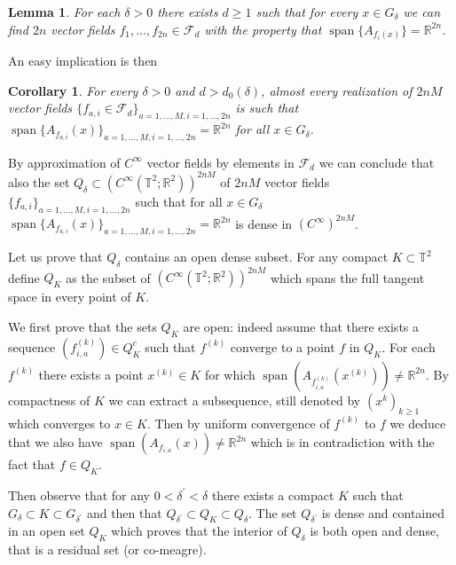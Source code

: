 \documentclass[11pt,a4paper]{article}%
\newtheorem{corollary}[theorem]{Corollary}
\newtheorem{lemma}[theorem]{Lemma}
\begin{document}
\begin{lemma}
For each $\delta> 0$ there exists $d \geqslant1$ such that for every $x \in
G_{\delta}$ we can find $2 n$ vector fields $f_{1}, \ldots, f_{2 n}
\in\mathcal{F}_{d}$ with the property that $\operatorname{span}  \{A_{f_{i}
(x)} \}=\mathbb{R}^{2 n}$.
\end{lemma}

An easy implication is then

\begin{corollary}
For every $\delta> 0$ and $d > d_{0} (\delta)$, almost every realization of $2
n  M$ vector fields $\{f_{a, i} \in\mathcal{F}_{d} \}_{a = 1, \ldots, M, i =
1, \ldots, 2 n}$ is such that $\operatorname{span}  \{A_{f_{a, i}} (x)\}_{a =
1, \ldots, M, i = 1, \ldots, 2 n} =\mathbb{R}^{2 n}$ for all $x \in G_{\delta
}$.
\end{corollary}

By approximation of $C^{\infty}$ vector fields by elements in $\mathcal{F}%
_{d}$ we can conclude that also the set $Q_{\delta} \subset(C^{\infty
}(\mathbb{T}^{2};\mathbb{R}^{2}))^{2 n M}$ of $2 n M$ vector fields $\{f_{a,
i} \}_{a = 1, \ldots, M, i = 1, \ldots, 2 n}$ such that for all $x \in
G_{\delta}$ $\operatorname{span}  \{A_{f_{a, i}} (x)\}_{a = 1, \ldots, M, i =
1, \ldots, 2 n} =\mathbb{R}^{2 n}$ is dense in $(C^{\infty})^{2 n M}$.

Let us prove that $Q_{\delta}$ contains an open dense subset. For any compact
$K\subset\mathbb{T}^{2}$ define $Q_{K}$ as the subset of $(C^{\infty
}(\mathbb{T}^{2};\mathbb{R}^{2}))^{2 n M}$ which spans the full tangent space in
every point of $K$.

We first prove that the sets $Q_{K}$ are open: indeed assume that there exists
a sequence $(f^{(k)}_{i,a}) \in Q_{K}^{c}$ such that $f^{(k)}$ converge to a
point $f$ in $Q_{K}$. For each $f^{(k)}$ there exists a point $x^{(k)} \in K$
for which $\operatorname{span} (A_{f^{(k)}_{i,a}}(x^{(k)})) \neq
\mathbb{R}^{2n}$. By compactness of $K$ we can extract a subsequence, still
denoted by $(x^{k})_{k\ge1}$ which converges to $x\in K$. Then by uniform
convergence of $f^{(k)}$ to $f$ we deduce that we also have
$\operatorname{span} (A_{f_{i,a}}(x)) \neq\mathbb{R}^{2n}$ which is in
contradiction with the fact that $f\in Q_{K}$.

Then observe that for any $0< \delta^{\prime}< \delta$ there exists a compact
$K$ such that $G_{\delta} \subset K \subset G_{\delta^{\prime}}$ and then that
$Q_{\delta^{\prime}} \subset Q_{K} \subset Q_{\delta}$. The set $Q_{\delta
^{\prime}}$ is dense and contained in an open set $Q_{K}$ which proves that
the interior of $Q_{\delta}$ is both open and dense, that is a residual set
(or co-meagre).
\end{document}
